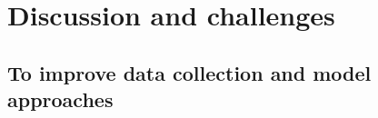 

%

\section{Discussion and challenges}


\subsection{To improve data collection and model approaches}

